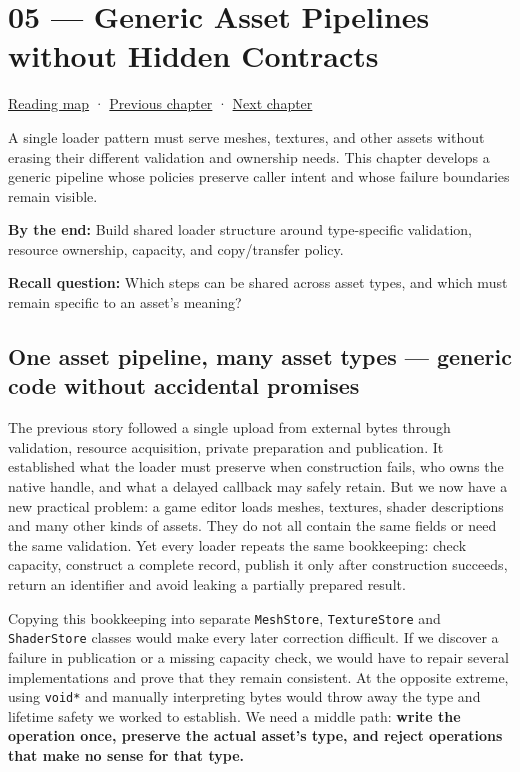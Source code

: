\hypertarget{01-foundations-i-ch005}{}
\chapter{05 --- Generic Asset Pipelines without Hidden Contracts}\label{01-foundations-i-ch005-generic-asset-pipelines-without-hidden-contracts}

\hyperref[volume-reading-map]{Reading map} · \hyperref[01-foundations-i-ch004]{Previous chapter} · \hyperref[01-foundations-i-ch006]{Next chapter}

A single loader pattern must serve meshes, textures, and other assets without erasing their different validation and ownership needs. This chapter develops a generic pipeline whose policies preserve caller intent and whose failure boundaries remain visible.

\textbf{By the end:} Build shared loader structure around type-specific validation, resource ownership, capacity, and copy/transfer policy.

\textbf{Recall question:} Which steps can be shared across asset types, and which must remain specific to an asset's meaning?

\section{One asset pipeline, many asset types --- generic code without accidental promises}\label{01-foundations-i-ch005-one-asset-pipeline-many-asset-types-generic-code-without-accidental-promises}

The previous story followed a single upload from external bytes through validation, resource acquisition, private preparation and publication. It established what the loader must preserve when construction fails, who owns the native handle, and what a delayed callback may safely retain. But we now have a new practical problem: a game editor loads meshes, textures, shader descriptions and many other kinds of assets. They do not all contain the same fields or need the same validation. Yet every loader repeats the same bookkeeping: check capacity, construct a complete record, publish it only after construction succeeds, return an identifier and avoid leaking a partially prepared result.

Copying this bookkeeping into separate \texttt{MeshStore}, \texttt{TextureStore} and \texttt{ShaderStore} classes would make every later correction difficult. If we discover a failure in publication or a missing capacity check, we would have to repair several implementations and prove that they remain consistent. At the opposite extreme, using \texttt{void*} and manually interpreting bytes would throw away the type and lifetime safety we worked to establish. We need a middle path: \textbf{write the operation once, preserve the actual asset's type, and reject operations that make no sense for that type.}


